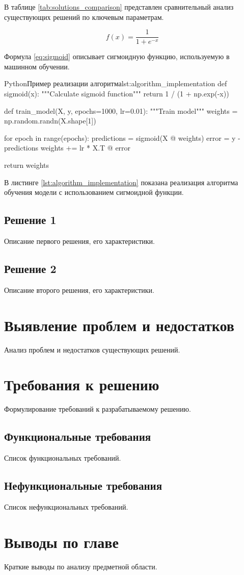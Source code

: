 В таблице \ref{tab:solutions_comparison} представлен сравнительный анализ существующих решений по ключевым параметрам.

\begin{equation}
f(x) = \frac{1}{1 + e^{-x}}
\label{eq:sigmoid}
\end{equation}

Формула \ref{eq:sigmoid} описывает сигмоидную функцию, используемую в машинном обучении.

\begin{CodeBlock}{Python}{Пример реализации алгоритма}{lst:algorithm_implementation}
def sigmoid(x):
    """Calculate sigmoid function"""
    return 1 / (1 + np.exp(-x))

def train_model(X, y, epochs=1000, lr=0.01):
    """Train model"""
    weights = np.random.randn(X.shape[1])
    
    for epoch in range(epochs):
        predictions = sigmoid(X @ weights)
        error = y - predictions
        weights += lr * X.T @ error
    
    return weights
\end{CodeBlock}

В листинге \ref{lst:algorithm_implementation} показана реализация алгоритма обучения модели с использованием сигмоидной функции.

\subsection{Решение 1}

Описание первого решения, его характеристики.

\subsection{Решение 2}

Описание второго решения, его характеристики.

\section{Выявление проблем и недостатков}

Анализ проблем и недостатков существующих решений.

\section{Требования к решению}

Формулирование требований к разрабатываемому решению.

\subsection{Функциональные требования}

Список функциональных требований.

\subsection{Нефункциональные требования}

Список нефункциональных требований.

\section{Выводы по главе}

Краткие выводы по анализу предметной области.
